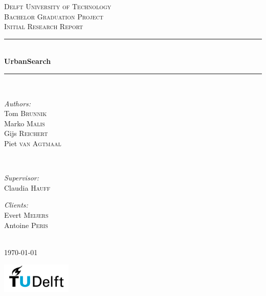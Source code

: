 \begin{titlepage}

\newcommand{\HRule}{\rule{\linewidth}{0.5mm}}

\center
 
\textsc{\LARGE Delft University of Technology}\\[1.5cm]
\textsc{\Large Bachelor Graduation Project}\\[0.5cm]
\textsc{\large Initial Research Report}\\[0.5cm]

\HRule \\[0.4cm]
{ \huge \bfseries UrbanSearch}\\[0.4cm]
\HRule \\[1.5cm]
 

\begin{minipage}{0.4\textwidth}
\begin{flushleft} \large
\emph{Authors:}\\
Tom \textsc{Brunnik}\\
Marko \textsc{Malis}\\
Gijs \textsc{Reichert}\\
Piet \textsc{van Agtmaal}\\
\end{flushleft}
\end{minipage}
~
\begin{minipage}{0.4\textwidth}
\begin{flushright} \large
\emph{Supervisor:} \\
Claudia \textsc{Hauff}

\emph{Clients:} \\
Evert \textsc{Meijers}\\
Antoine \textsc{Peris}
\end{flushright}
\end{minipage}\\[4cm]


{\large \today}\\[3cm]

\vfill

\raggedright
\includegraphics[width=0.25\textwidth]{logo}

\end{titlepage}